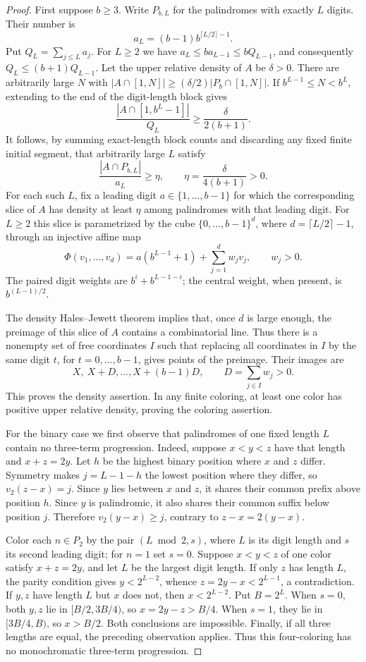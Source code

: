 \documentclass[11pt,a4paper]{article}
\theoremstyle{definition}
\theoremstyle{remark}
\numberwithin{equation}{section}
\begin{document}
\begin{proof}
First suppose $b\geq3$.  Write $P_{b,L}$ for the palindromes with exactly
$L$ digits.  Their number is
\[
 a_L=(b-1)b^{\lceil L/2\rceil-1}.
\]
Put $Q_L=\sum_{j\leq L}a_j$.  For $L\geq2$ we have
$a_L\leq b a_{L-1}\leq bQ_{L-1}$, and consequently
$Q_L\leq(b+1)Q_{L-1}$.
Let the upper relative density of $A$ be $\delta>0$.  There are arbitrarily
large $N$ with $|A\cap[1,N]|\geq(\delta/2)|P_b\cap[1,N]|$.
If $b^{L-1}\leq N<b^L$, extending to the end of the digit-length block gives
\[
 \frac{|A\cap[1,b^L-1]|}{Q_L}\geq\frac{\delta}{2(b+1)}.
\]
It follows, by summing exact-length block counts and discarding any fixed
finite initial segment, that arbitrarily large $L$ satisfy
\[
 \frac{|A\cap P_{b,L}|}{a_L}\geq\eta,
 \qquad \eta=\frac{\delta}{4(b+1)}>0.
\]
For each such $L$, fix a leading digit $a\in\{1,\ldots,b-1\}$ for which the
corresponding slice of $A$ has density at least $\eta$ among palindromes
with that leading digit.  For $L\geq2$ this slice is parametrized by the cube
$\{0,\ldots,b-1\}^{d}$, where $d=\lceil L/2\rceil-1$, through an injective
affine map
\[
 \Phi(v_1,\ldots,v_d)
   =a(b^{L-1}+1)+\sum_{j=1}^{d}w_jv_j,
 \qquad w_j>0.
\]
The paired digit weights are $b^i+b^{L-1-i}$; the central weight, when
present, is $b^{(L-1)/2}$.

The density Hales--Jewett theorem implies that, once $d$ is large enough,
the preimage of this slice of $A$ contains a combinatorial line.  Thus there
is a nonempty set of free coordinates $I$ such that replacing all coordinates
in $I$ by the same digit $t$, for $t=0,\ldots,b-1$, gives points of the
preimage.  Their images are
\[
 X,\ X+D,\ldots,X+(b-1)D,
 \qquad D=\sum_{j\in I}w_j>0.
\]
This proves the density assertion.  In any finite coloring, at least one
color has positive upper relative density, proving the coloring assertion.

For the binary case we first observe that palindromes of one fixed length
$L$ contain no three-term progression.  Indeed, suppose $x<y<z$ have that
length and $x+z=2y$.  Let $h$ be the highest binary position where $x$ and
$z$ differ.  Symmetry makes $j=L-1-h$ the lowest position where they differ,
so $v_2(z-x)=j$.  Since $y$ lies between $x$ and $z$, it shares their common
prefix above position $h$.  Since $y$ is palindromic, it also shares their
common suffix below position $j$.  Therefore $v_2(y-x)\geq j$, contrary to
$z-x=2(y-x)$.

Color each $n\in P_2$ by the pair $(L\bmod2,s)$, where $L$ is its digit
length and $s$ its second leading digit; for $n=1$ set $s=0$.
Suppose $x<y<z$ of one color satisfy $x+z=2y$, and let $L$ be the largest
digit length.  If only $z$ has length $L$, the parity condition gives
$y<2^{L-2}$, whence $z=2y-x<2^{L-1}$, a contradiction.
If $y,z$ have length $L$ but $x$ does not, then $x<2^{L-2}$.
Put $B=2^L$.  When $s=0$, both $y,z$ lie in $[B/2,3B/4)$, so
$x=2y-z>B/4$.  When $s=1$, they lie in $[3B/4,B)$, so $x>B/2$.
Both conclusions are impossible.  Finally, if all three lengths are equal,
the preceding observation applies.  Thus this four-coloring has no
monochromatic three-term progression.


\end{proof}
\end{document}
